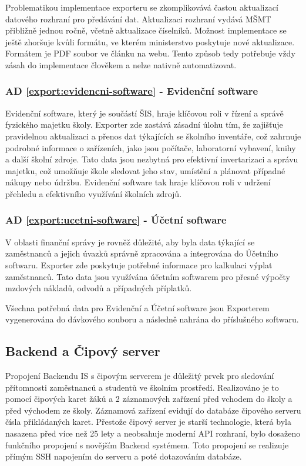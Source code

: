 \documentclass[FM,Proj]{tulthesis}
\begin{document}
Problematikou implementace exporteru se zkomplikovává častou aktualizací datového rozhraní
pro předávání dat. Aktualizaci rozhraní vydává MŠMT přibližně jednou ročně, včetně aktualizace
číselníků\cite{msmt-rozhrani-predavani-dat-2023}. Možnost implementace se ještě zhoršuje kvůli formátu,
ve kterém ministerstvo poskytuje nové aktualizace. Formátem je PDF soubor ve článku na webu. Tento 
způsob tedy potřebuje vždy zásah do implementace člověkem a nelze nativně automatizovat.

\subsubsection*{AD \ref{export:evidencni-software} - Evidenční software}
Evidenční software, který je součástí ŠIS, hraje klíčovou roli v řízení a správě fyzického
majetku školy. Exporter zde zastává zásadní úlohu tím, že zajišťuje pravidelnou aktualizaci 
a přenos dat týkajících se školního inventáře, což zahrnuje podrobné informace o zařízeních,
jako jsou počítače, laboratorní vybavení, knihy a další školní zdroje. Tato data jsou 
nezbytná pro efektivní invertarizaci a správu majetku, což umožňuje škole sledovat jeho 
stav, umístění a plánovat případné nákupy nebo údržbu. Evidenční software tak hraje
klíčovou roli v udržení přehledu a efektivního využívání školních zdrojů. 

\subsubsection*{AD \ref{export:ucetni-software} - Účetní software}
V oblasti finanční správy je rovněž důležité, aby byla data týkající se zaměstnanců a jejich
úvazků správně zpracována a integrována do Účetního softwaru. Exporter zde poskytuje potřebné
informace pro kalkulaci výplat zaměstnanců. Tato data jsou využívána účetním softwarem pro 
přesné výpočty mzdových nákladů, odvodů a případných příplatků.

Všechna potřebná data pro Evidenční a Účetní software jsou Exporterem vygenerována 
do dávkového souboru a následně nahrána do příslušného softwaru. 

\subsection{Backend a Čipový server}
\label{section:backend-a-cipovy-server}
Propojení Backendu IS s čipovým serverem je důležitý prvek pro sledování přítomnosti
zaměstnanců a studentů ve školním prostředí. Realizováno je to pomocí čipových karet žáků
a 2 záznamových zařízení před vchodem do školy a před východem ze školy. Záznamová zařízení
evidují do databáze čipového serveru čísla přikládaných karet. Přestože čipový 
server je starší technologie, která byla nasazena před více než 25 lety a neobsahuje 
moderní API rozhraní, bylo dosaženo funkčního propojení s novějším Backend systémem. 
Toto propojení se realizuje přímým SSH napojením do serveru a poté dotazováním databáze.
\end{document}
